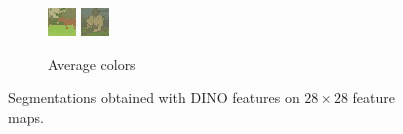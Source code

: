 \documentclass[11pt,a4paper]{article}
\begin{document}
\begin{figure}
\begin{subfigure}[b]{0.3\textwidth}
        \includegraphics[width=\textwidth]{figures/dino/tile_1/291000_avg.png}
        \includegraphics[width=\textwidth]{figures/dino/tile_1/376043_avg.png}
        \caption{Average colors}
    \end{subfigure}
       \caption{Segmentations obtained with DINO features on $28\times 28$ feature maps.}
       \label{fig:results-dino}
\end{figure}
\end{document}
